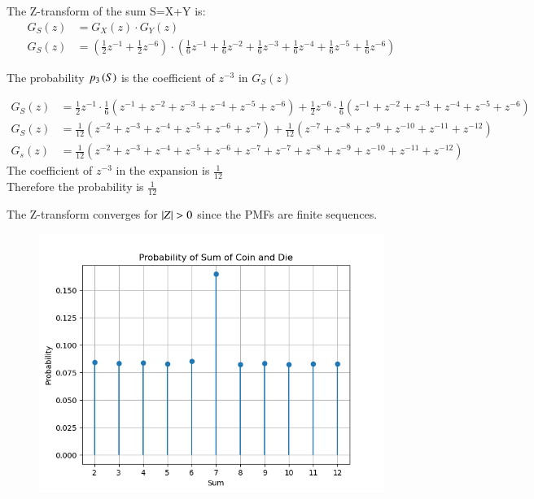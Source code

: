\documentclass[journal]{IEEEtran}
\begin{document}
The Z-transform of the sum S=X+Y is:
\begin{align}
G_S(z) &= G_X(z) \cdot G_Y(z)\\
G_S(z) &= \left(\frac{1}{2}z^{-1} + \frac{1}{2}z^{-6}\right) \cdot \left(\frac{1}{6}z^{-1} + \frac{1}{6}z^{-2} + \frac{1}{6}z^{-3} + \frac{1}{6}z^{-4} + \frac{1}{6}z^{-5} + \frac{1}{6}z^{-6}\right)
\end{align}



The probability $p_3\left(S\right)$ is the coefficient of $z^{-3}$ in $G_S(z)$



\begin{align}
    G_S(z) &= \frac{1}{2}z^{-1} \cdot \frac{1}{6}(z^{-1} + z^{-2} + z^{-3} + z^{-4} + z^{-5} + z^{-6}) + \frac{1}{2}z^{-6} \cdot \frac{1}{6}(z^{-1} + z^{-2} + z^{-3} + z^{-4} + z^{-5} + z^{-6})\\
    G_S(z) &= \frac{1}{12}(z^{-2} + z^{-3} + z^{-4} + z^{-5} + z^{-6} + z^{-7}) + \frac{1}{12}(z^{-7} + z^{-8} + z^{-9} + z^{-10} + z^{-11} + z^{-12})\\
    G_s(z) &= \frac{1}{12}(z^{-2} + z^{-3} + z^{-4} + z^{-5} + z^{-6} + z^{-7}+z^{-7} + z^{-8} + z^{-9} + z^{-10} + z^{-11} + z^{-12})
\end{align}
The coefficient of $z^{-3}$ in the expansion is $\frac{1}{12}$ \\
Therefore the probability is $\frac{1}{12}$




The Z-transform converges for $\left\vert Z\right\vert>0$ since the PMFs are finite sequences.
\begin{figure}[h!]
	\centering
	\includegraphics[width=\columnwidth]{figs/Figure_1.png}
	\label{stemplot}
\end{figure}
\end{document}
